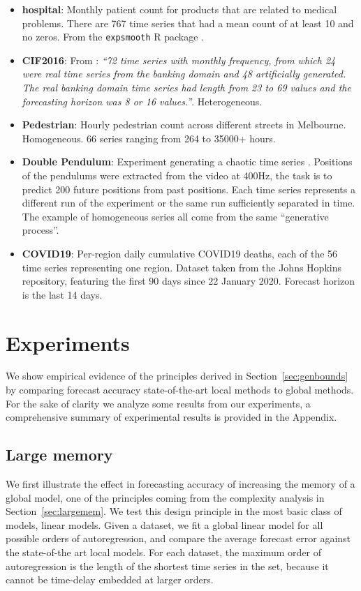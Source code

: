 \documentclass[a4paper]{article}
\theoremstyle{custom}
\begin{document}
\begin{itemize}
\item \textbf{hospital}: Monthly patient count for products that are related to medical problems. There are 767 time series that had a mean count of at least 10 and no zeros. From the \texttt{expsmooth} R package \cite{Rexpsmooth}.
\item \textbf{CIF2016}: From \cite{vstvepnivcka2017cif}: \textit{``72 time series with monthly frequency, from which 24 were real time series from the banking domain and 48 artificially generated. The real banking domain time series had length from 23 to 69 values and the forecasting horizon was 8 or 16 values.''}. Heterogeneous.
\item \textbf{Pedestrian}: Hourly pedestrian count across different streets in Melbourne. Homogeneous. 66 series ranging from 264 to 35000+  hours.
\item \textbf{Double Pendulum}: Experiment generating a chaotic time series \cite{asseman2018learning}. Positions of the pendulums were extracted from the video at 400Hz, the task is to predict 200 future positions from past positions. Each time series represents a different run of the experiment or the same run sufficiently separated in time. The example of homogeneous series all come from the same ``generative process''.
\item \textbf{COVID19}: Per-region daily cumulative COVID19 deaths, each of the 56 time series representing one region.
Dataset taken from the Johns Hopkins repository, featuring the first 90 days since 22 January 2020. Forecast horizon is the last 14 days.
\end{itemize}

\section{Experiments}
\label{sec:experires}

We show empirical evidence of the principles derived in Section~\ref{sec:genbounds} by comparing forecast accuracy state-of-the-art local methods to global methods. For the sake of clarity we analyze some results from our experiments, a comprehensive summary of experimental results is provided in the Appendix.

\subsection{Large memory}
\label{sec:largememexp}

We first illustrate the effect in forecasting accuracy of increasing the memory of a global model, one of the principles coming from the complexity analysis in Section~\ref{sec:largemem}.
We test this design principle in the most basic class of models, linear models.
Given a dataset, we fit a global linear model for all possible orders of autoregression, and compare the average forecast error against the state-of-the art local models. For each dataset, the maximum order of autoregression is the length of the shortest time series in the set, because it cannot be time-delay embedded at larger orders.
\end{document}
